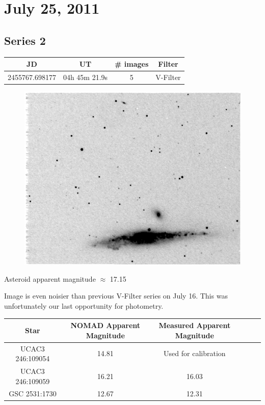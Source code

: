\documentclass[11pt,a4paper]{article}
\begin{document}

\clearpage
\section*{July 25, 2011}
\subsection{Series 2}
\begin{center}
\begin{tabular}{| c |  c | c | c | }
\hline
JD & UT & \# images & Filter \\ \hline
2455767.698177 & 04h 45m 21.9s & 5 & V-Filter \\ \hline
\end{tabular}
\end{center}

\begin{figure}[h!]
  \centering
   \includegraphics[width=\textwidth]{LSPR_annotated_images/Jul25Series2.png}
\end{figure}

Asteroid apparent magnitude $\approx$ 17.15

Image is even noisier than previous V-Filter series on July 16. This was unfortunately our last opportunity for photometry.

\begin{center}
\begin{tabular}{| c |  c | c | c | c |  c | }
\hline
Star & NOMAD Apparent Magnitude & Measured Apparent Magnitude \\ \hline \hline
UCAC3 246:109054 & 14.81 & Used for calibration \\ \hline
UCAC3 246:109059 & 16.21 & 16.03 \\ \hline
GSC 2531:1730 & 12.67 & 12.31 \\ \hline
\end{tabular}
\end{center}

\end{document}
